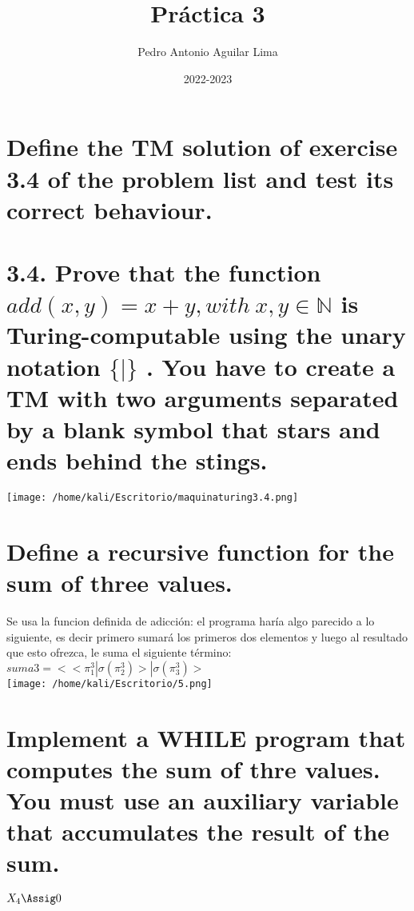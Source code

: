 \documentclass[11pt]{article}
\title{\textbf{Práctica 3}}
\author{Pedro Antonio Aguilar Lima}
\date{2022-2023}
\begin{document}
\maketitle
\thispagestyle{empty}

\section{Define the TM solution of exercise 3.4 of the problem list and test its correct behaviour. 
\\ 
\\
3.4. Prove that the function $add(x,y)=x+y, with \ x,y \in  \mathds{N} $ is Turing-computable using the unary notation $ \{ | \} $ . You have to create a TM with two arguments
separated by a blank symbol that stars and ends behind the stings.}
\texttt{[image: /home/kali/Escritorio/maquinaturing3.4.png]}


\newpage

\section{Define a recursive function for the sum of three values.}
 
Se usa la funcion definida de adicción: el programa haría algo parecido a lo  siguiente, es decir primero sumará los primeros dos elementos y luego al resultado que esto ofrezca, le suma el siguiente término:
\\

 $suma3=<<\pi^3_1|\sigma(\pi^3_2)>|\sigma(\pi^3_3)>$
 \\
 
 \texttt{[image: /home/kali/Escritorio/5.png]}
 
\newpage

\section{Implement a WHILE program that computes the sum of thre values. You must use an auxiliary variable that accumulates the result of the sum.}

\begin{whilecode}[H]
$X_4 \Assig 0$

 
 

 \end{whilecode}
\end{document}
